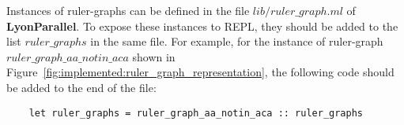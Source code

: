 Instances of ruler-graphs can be defined in the file \colorbox{Ivory2}{$lib/ruler\_graph.ml$} of \textbf{LyonParallel}. To expose these instances to REPL, they should be added to the list \colorbox{Ivory2}{$ruler\_graphs$} in the same file. For example, for the instance of ruler-graph \colorbox{Ivory2}{$ruler\_graph\_aa\_notin\_aca$} shown in Figure~\ref{fig:implemented:ruler_graph_representation}, the following code should be added to the end of the file:
\begin{verbatim}
    let ruler_graphs = ruler_graph_aa_notin_aca :: ruler_graphs 
\end{verbatim}



